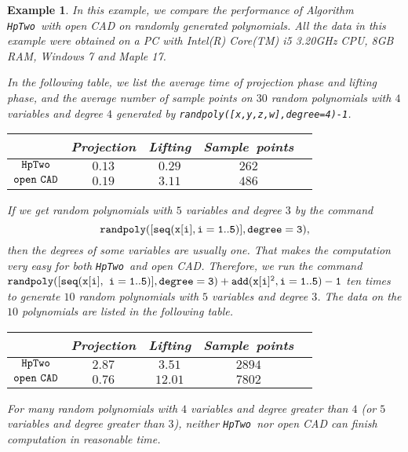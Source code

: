 \documentclass[amsthm]{elsart}
\def \TwoHp {{\tt HpTwo}}
\newtheorem{ex}{Example}   \renewcommand{\algorithmicrequire}{\textsf{Input:}}
\begin{document}
\begin{ex}\label{ex:61}
In this example, we compare the performance of Algorithm \TwoHp\ with open CAD on randomly generated polynomials. All the data in this example were obtained on a PC with Intel(R) Core(TM) i5 3.20GHz CPU, 8GB RAM, Windows 7 and Maple 17.

In the following table, we list the average time of projection phase and lifting phase, and the average number of sample points on $30$ random polynomials with $4$ variables and degree $4$ generated by {\tt randpoly([x,y,z,w],degree=4)-1}.

\begin{center}
                \begin{tabular}{ccccc}
                        \hline & {\rm Projection} &{\rm Lifting}& {\rm Sample\ points}  & \\
                        \hline
                        $\TwoHp$           &$0.13$& $ 0.29$& $262$&\\
                        ${\tt open\ CAD}$         & $0.19$&$ 3.11$&$ 486$&\\
                        \hline
                \end{tabular}
        \end{center}
If we get random polynomials with $5$ variables and degree $3$ by the command
$${\tt randpoly([seq(x[i],i=1..5)], degree=3)},$$ then the degrees of some variables are usually one. That makes the computation very easy for both \TwoHp\ and open CAD. Therefore,
we run the command ${\tt randpoly([seq(x[i],}$ ${\tt i=1..5)], degree=3)+add(x[i]^2,i=1..5)-1}$ ten times to generate $10$ random polynomials with $5$ variables and degree $3$. The data on the $10$ polynomials are listed in the following table.
\begin{center}
                \begin{tabular}{ccccc}
                        \hline & {\rm Projection} &{\rm Lifting}& {\rm Sample\ points}  & \\
                        \hline
                        $\TwoHp$           &$2.87$& $ 3.51$& $2894$&\\
                        ${\tt open\ CAD}$         & $0.76$&$ 12.01$&$7802$&\\
                        \hline
                \end{tabular}
        \end{center}
For many random polynomials with $4$ variables and degree greater than $4$ (or $5$ variables and degree greater than $3$), neither \TwoHp\ nor open CAD can finish computation in reasonable time. \end{ex}
\end{document}
